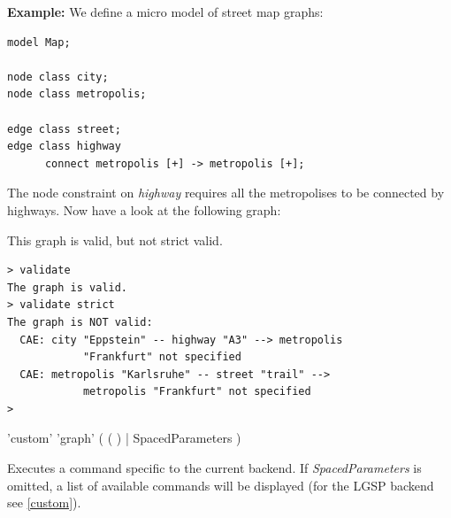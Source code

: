 {\small \textbf{Example:} We define a micro model of street map graphs:
\lstset{language=grgenmodel}
\begin{lstlisting} 
model Map;

node class city;
node class metropolis;

edge class street;
edge class highway
      connect metropolis [+] -> metropolis [+];
\end{lstlisting}
The node constraint on \emph{highway} requires all the metropolises to be connected by highways. Now have a look at the following graph:
\begin{center}
\end{center}

This graph is valid, but not strict valid.
\lstset{language=grshell}
\begin{lstlisting} 
> validate
The graph is valid.
> validate strict
The graph is NOT valid:
  CAE: city "Eppstein" -- highway "A3" --> metropolis 
            "Frankfurt" not specified
  CAE: metropolis "Karlsruhe" -- street "trail" --> 
            metropolis "Frankfurt" not specified
>
\end{lstlisting}}

\begin{rail}
  'custom' 'graph' ( ( ) | SpacedParameters )
\end{rail}
Executes a command specific to the current backend. If \emph{SpacedParameters} is omitted, a list of available commands will be displayed (for the LGSP backend see \ref{custom}).

